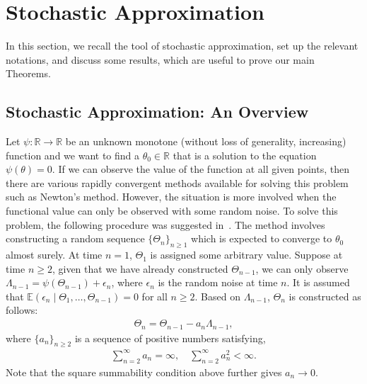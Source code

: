 \documentclass[12pt]{amsart}
\theoremstyle{plain}
\theoremstyle{remark}
\numberwithin{equation}{section}
\begin{document}
\section{Stochastic Approximation}\label{sec:sa}

In this section, we recall the tool of stochastic approximation, set up the relevant notations, and discuss some results, which are useful to prove our main Theorems.

\subsection{Stochastic Approximation: An Overview}\label{sec:sa-ldrw-gerw}

Let $\psi: \mathbb{R} \to \mathbb{R}$ be an unknown monotone (without loss of generality, increasing) function and we want to find a $\theta_0 \in \mathbb{R}$ that is a solution to the equation $\psi(\theta) = 0$. If we can observe the value of the function at all given points, then there are various
rapidly convergent methods available for solving this problem such as Newton's method. However, the situation is more involved when the functional value can only be observed with some random noise. To solve this problem, the following procedure was suggested in~\cite{robbins1951stochastic}. The method involves constructing a random sequence $\{\Theta_n\}_{n \geq 1}$ which is expected to converge to $\theta_0$ almost surely. At time $n = 1$, $\Theta_1$ is assigned some arbitrary value. Suppose at time $n \geq 2$, given that we have already constructed $\Theta_{n-1}$, we can only observe $\Lambda_{n-1} = \psi(\Theta_{n-1}) + \epsilon_n$, where $\epsilon_n$ is the random noise at time $n$. It is assumed that $\mathbb{E}\left(\epsilon_n \mid \Theta_1, \ldots, \Theta_{n-1}\right) = 0$ for all $n \geq 2$. Based on $\Lambda_{n-1}$, $\Theta_n$ is constructed as follows:
\begin{align}\label{eq:basic_sa}
     \Theta_n = \Theta_{n-1} - a_{n} \Lambda_{n-1},
\end{align}
where $\{a_n\}_{n\geq 2}$ is a sequence of positive numbers satisfying,
\begin{align}\label{eq:a_n}
    \sum_{n=2}^{\infty} a_n = \infty, \quad \sum_{n=2}^{\infty} a^2_n < \infty.
\end{align}
Note that the square summability condition above further gives $a_n\to0$.
\end{document}
